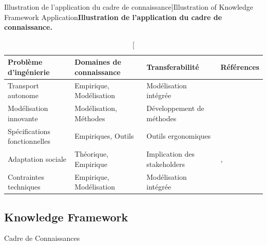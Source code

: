 


\begin{table}[h!]
\caption[Illustration of Knowledge Framework Application][Illustration de l'application du cadre de connaissance]{Illustration of Knowledge Framework Application\label{tab:knowledgeframework:application}}{\textbf{Illustration de l'application du cadre de connaissance.}\label{tab:knowledgeframework:application}}
\begin{tabular}[10pt]{|p{3.7cm}|p{3.7cm}|p{3.7cm}|p{4.5cm}|}
\hline
\textbf{Problème d'ingénierie} & \textbf{Domaines de connaissance} & \textbf{Transferabilité} & \textbf{Références}\\\hline
Transport autonome & Empirique, Modélisation & Modélisation intégrée & \cite{belmonte2008automatisation}\\\hline
Modélisation innovante & Modélisation, Méthodes & Développement de méthodes & \cite{balbo2016positionnement}\\\hline
Spécifications fonctionnelles & Empiriques, Outils & Outils ergonomiques & \cite{foot2005faut}\\\hline
Adaptation sociale & Théorique, Empirique & Implication des stakeholders & \cite{foot1994ratp}, \cite{hatchuel1988stations}\\\hline
Contraintes techniques & Empirique, Modélisation & Modélisation intégrée & \cite{moreno2016etude}\\\hline
\end{tabular}
\end{table}



\subsection{Knowledge Framework}{Cadre de Connaissances}


